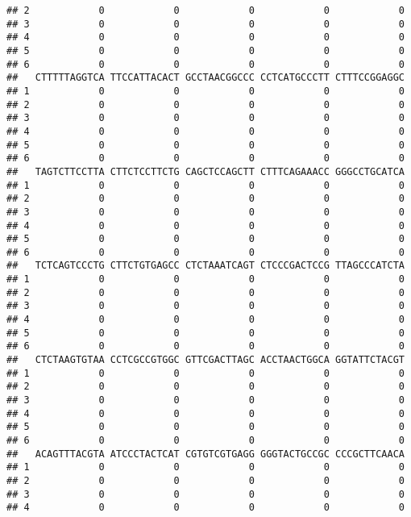 \documentclass[]{article}
\begin{document}
\begin{verbatim}
## 2            0            0            0            0            0
## 3            0            0            0            0            0
## 4            0            0            0            0            0
## 5            0            0            0            0            0
## 6            0            0            0            0            0
##   CTTTTTAGGTCA TTCCATTACACT GCCTAACGGCCC CCTCATGCCCTT CTTTCCGGAGGC
## 1            0            0            0            0            0
## 2            0            0            0            0            0
## 3            0            0            0            0            0
## 4            0            0            0            0            0
## 5            0            0            0            0            0
## 6            0            0            0            0            0
##   TAGTCTTCCTTA CTTCTCCTTCTG CAGCTCCAGCTT CTTTCAGAAACC GGGCCTGCATCA
## 1            0            0            0            0            0
## 2            0            0            0            0            0
## 3            0            0            0            0            0
## 4            0            0            0            0            0
## 5            0            0            0            0            0
## 6            0            0            0            0            0
##   TCTCAGTCCCTG CTTCTGTGAGCC CTCTAAATCAGT CTCCCGACTCCG TTAGCCCATCTA
## 1            0            0            0            0            0
## 2            0            0            0            0            0
## 3            0            0            0            0            0
## 4            0            0            0            0            0
## 5            0            0            0            0            0
## 6            0            0            0            0            0
##   CTCTAAGTGTAA CCTCGCCGTGGC GTTCGACTTAGC ACCTAACTGGCA GGTATTCTACGT
## 1            0            0            0            0            0
## 2            0            0            0            0            0
## 3            0            0            0            0            0
## 4            0            0            0            0            0
## 5            0            0            0            0            0
## 6            0            0            0            0            0
##   ACAGTTTACGTA ATCCCTACTCAT CGTGTCGTGAGG GGGTACTGCCGC CCCGCTTCAACA
## 1            0            0            0            0            0
## 2            0            0            0            0            0
## 3            0            0            0            0            0
## 4            0            0            0            0            0

\end{verbatim}
\end{document}
